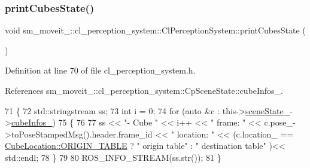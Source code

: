 \subsubsection{\texorpdfstring{print\+Cubes\+State()}{printCubesState()}}
{\footnotesize\ttfamily void sm\+\_\+moveit\+\_\+::cl\+\_\+perception\+\_\+system\+::\+Cl\+Perception\+System\+::print\+Cubes\+State (\begin{DoxyParamCaption}{ }\end{DoxyParamCaption})\hspace{0.3cm}{\ttfamily [inline]}}



Definition at line 70 of file cl\+\_\+perception\+\_\+system.\+h.



References sm\+\_\+moveit\+\_\+::cl\+\_\+perception\+\_\+system\+::\+Cp\+Scene\+State\+::cube\+Infos\+\_\+.


\begin{DoxyCode}
71             \{
72                 std::stringstream ss;
73                 \textcolor{keywordtype}{int} i = 0;
74                 \textcolor{keywordflow}{for} (\textcolor{keyword}{auto} &c : this->\hyperlink{classsm__moveit__4_1_1cl__perception__system_1_1ClPerceptionSystem_a82ea8feeb2fa43349f91ed59137b3890}{sceneState\_}->\hyperlink{classsm__moveit__4_1_1cl__perception__system_1_1CpSceneState_a734a45934cccf19ac5c886cd94bc8cda}{cubeInfos\_})
75                 \{
76 
77                     ss << \textcolor{stringliteral}{"- Cube "} << i++ << \textcolor{stringliteral}{" frame: "} << c.pose\_->toPoseStampedMsg().header.frame\_id << \textcolor{stringliteral}{
      " location: "} << (c.location\_ == \hyperlink{namespacesm__moveit__4_1_1cl__perception__system_a0d1b8834532a7cf9d19670791eece6d1ae5ee34c3ef8ec4a46a00a218416c7b1d}{CubeLocation::ORIGIN\_TABLE} ? \textcolor{stringliteral}{" origin table"} : \textcolor{stringliteral}{"
       destination table"} )<< std::endl;
78                 \}
79 
80                 ROS\_INFO\_STREAM(ss.str());
81             \}
\end{DoxyCode}
\mbox{\label{classsm__moveit__4_1_1cl__perception__system_1_1ClPerceptionSystem_a91de8cf71c93738f8bcbea388c84a5dd}} 

